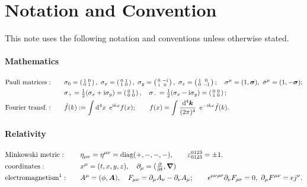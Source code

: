 \documentclass[CheatSheet]{subfiles}
\begin{document}
\summarystyle
\setcounter{section}{-1}
\section{Notation and Convention}
This note uses the following notation and conventions unless otherwise stated.

\paragraph{Mathematics}
\begin{alignat}{2}
&\text{Pauli matrices}:&\quad&
 \sigma_0 = \spmat{1&0\\0&1},~
\sigma_x = \spmat{0&1\\1&0},~
\sigma_y = \spmat{0&-\ii\\\ii&0},~
\sigma_z = \spmat{1&0\\0&-1};\quad
\sigma^\mu=(1,\vc\sigma),~
\bar\sigma^\mu=(1,-\vc\sigma);
\notag\\
&&&
\sigma_+ = \tfrac12(\sigma_x+\ii\sigma_y) = \spmat{0&1\\0&0},\quad
\sigma_- = \tfrac12(\sigma_x-\ii\sigma_y) = \spmat{0&0\\1&0};
\\
&\text{Fourier transf.}:&&
 \tilde f(k) := \int\dd^4x\ \ee^{\ii kx}f(x); \qquad
        f(x) = \int\ddP[4]{k}\ \ee^{-\ii kx}\tilde f(k).
\end{alignat}


\paragraph{Relativity}
\begin{alignat}{2}
&\text{Minkowski metric}:&\quad&
\eta_{\mu\nu} = \eta^{\mu\nu}=\diag(+,-,-,-),
\qquad
\vep^{0123}_{0123}=\pm1.
\\
&\text{coordinates}:&&
x^\mu=(t,x,y,z),\quad
\partial_\mu=(\tfrac{\partial}{\partial t},\vc\nabla)
\\
&\text{electromagnetism\footnotemark}:&&
A^\mu=(\phi,\vc A),\quad
F_{\mu\nu}=\partial_\mu A_\nu-\partial_\nu A_\mu;\qquad
\epsilon^{\mu\nu\rho\sigma}\partial_\nu F_{\rho\sigma}=0,~
\partial_\mu  F^{\mu\nu}=e j^\nu.
\end{alignat}
\end{document}
